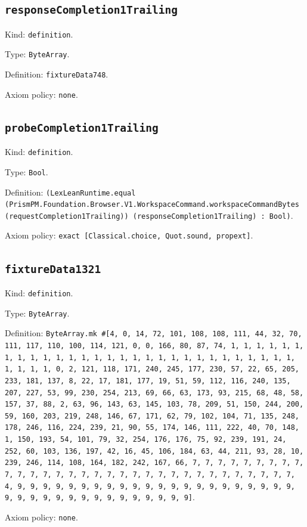 \documentclass[11pt]{article}
\begin{document}
\subsection*{\texttt{responseCompletion1Trailing}}
\noindent Kind: \texttt{definition}.\par
\noindent Type: \texttt{ByteArray}.\par
\noindent Definition: \texttt{fixtureData748}.\par
\noindent Axiom policy: \texttt{none}.\par
\subsection*{\texttt{probeCompletion1Trailing}}
\noindent Kind: \texttt{definition}.\par
\noindent Type: \texttt{Bool}.\par
\noindent Definition: \texttt{(LexLeanRuntime.equal (PrismPM.Foundation.Browser.V1.WorkspaceCommand.workspaceCommandBytes (requestCompletion1Trailing)) (responseCompletion1Trailing) : Bool)}.\par
\noindent Axiom policy: \texttt{exact [Classical.choice, Quot.sound, propext]}.\par
\subsection*{\texttt{fixtureData1321}}
\noindent Kind: \texttt{definition}.\par
\noindent Type: \texttt{ByteArray}.\par
\noindent Definition: \texttt{ByteArray.mk \#[4, 0, 14, 72, 101, 108, 108, 111, 44, 32, 70, 111, 117, 110, 100, 114, 121, 0, 0, 166, 80, 87, 74, 1, 1, 1, 1, 1, 1, 1, 1, 1, 1, 1, 1, 1, 1, 1, 1, 1, 1, 1, 1, 1, 1, 1, 1, 1, 1, 1, 1, 1, 1, 1, 1, 1, 0, 2, 121, 118, 171, 240, 245, 177, 230, 57, 22, 65, 205, 233, 181, 137, 8, 22, 17, 181, 177, 19, 51, 59, 112, 116, 240, 135, 207, 227, 53, 99, 230, 254, 213, 69, 66, 63, 173, 93, 215, 68, 48, 58, 157, 37, 88, 2, 63, 96, 143, 63, 145, 103, 78, 209, 51, 150, 244, 200, 59, 160, 203, 219, 248, 146, 67, 171, 62, 79, 102, 104, 71, 135, 248, 178, 246, 116, 224, 239, 21, 90, 55, 174, 146, 111, 222, 40, 70, 148, 1, 150, 193, 54, 101, 79, 32, 254, 176, 176, 75, 92, 239, 191, 24, 252, 60, 103, 136, 197, 42, 16, 45, 106, 184, 63, 44, 211, 93, 28, 10, 239, 246, 114, 108, 164, 182, 242, 167, 66, 7, 7, 7, 7, 7, 7, 7, 7, 7, 7, 7, 7, 7, 7, 7, 7, 7, 7, 7, 7, 7, 7, 7, 7, 7, 7, 7, 7, 7, 7, 7, 7, 4, 9, 9, 9, 9, 9, 9, 9, 9, 9, 9, 9, 9, 9, 9, 9, 9, 9, 9, 9, 9, 9, 9, 9, 9, 9, 9, 9, 9, 9, 9, 9, 9, 9, 9, 9, 9, 9]}.\par
\noindent Axiom policy: \texttt{none}.\par
\end{document}
